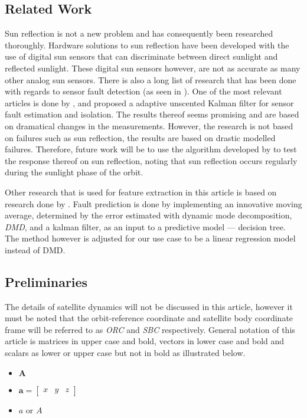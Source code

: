 \documentclass[letterpaper, 10 pt, conference]{ieeeconf}  %
\begin{document}
\subsection{Related Work}
Sun reflection is not a new problem and has consequently been researched thoroughly. Hardware solutions to sun reflection have been developed with the use of digital sun sensors that can discriminate between direct sunlight and reflected sunlight. These digital sun sensors however, are not as accurate as many other analog sun sensors. There is also a long list of research that has been done with regards to sensor fault detection (as seen in \cite{wang2019adaptive}). One of the most relevant articles is done by \textcite{wang2019adaptive}, and proposed a adaptive unscented Kalman filter for sensor fault estimation and isolation. The results thereof seems promising and are based on dramatical changes in the measurements. However, the research is not based on failures such as sun reflection, the results are based on drastic modelled failures. Therefore, future work will be to use the algorithm developed by \textcite{wang2019adaptive} to test the response thereof on sun reflection, noting that sun reflection occurs regularly during the sunlight phase of the orbit.

Other research that is used for feature extraction in this article is based on research done by \textcite{DeSilva2020}. Fault prediction is done by implementing an innovative moving average, determined by the error estimated with dynamic mode decomposition, \emph{DMD}, and a kalman filter, as an input to a predictive model --- decision tree. The method however is adjusted for our use case to be a linear regression model instead of DMD.

\subsection{Preliminaries}
The details of satellite dynamics will not be discussed in this article, however it must be noted that the orbit-reference coordinate and satellite body coordinate frame will be referred to as \emph{ORC} and \emph{SBC} respectively. General notation of this article is matrices in upper case and bold, vectors in lower case and bold and scalars as lower or upper case but not in bold as illustrated below.
\begin{itemize}
	\item{ $\mathbf{A}$}
	\item{ $\mathbf{a} = \begin{bmatrix} 
			x & y & z
		\end{bmatrix}$}
	\item{ $a$ or $A$}
\end{itemize}
\end{document}
